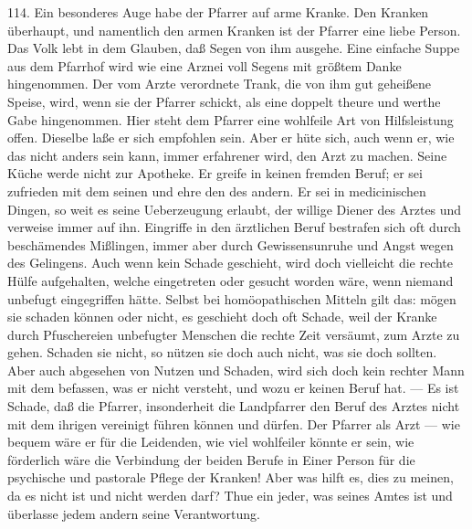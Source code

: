 114. Ein besonderes Auge habe der Pfarrer auf arme Kranke. Den Kranken überhaupt, und namentlich den armen Kranken ist der Pfarrer eine liebe Person. Das Volk lebt in dem Glauben, daß Segen von ihm ausgehe. Eine einfache Suppe aus dem Pfarrhof wird wie eine Arznei voll Segens mit größtem Danke hingenommen. Der vom Arzte verordnete Trank, die von ihm gut geheißene Speise, wird, wenn sie der Pfarrer schickt, als eine doppelt theure und werthe Gabe hingenommen. Hier steht dem Pfarrer eine wohlfeile Art von Hilfsleistung offen. Dieselbe laße er sich empfohlen sein. Aber er hüte sich, auch wenn er, wie das nicht anders sein kann, immer erfahrener wird, den Arzt zu machen. Seine Küche werde nicht zur Apotheke. Er greife in keinen fremden Beruf; er sei zufrieden mit dem seinen und ehre den des
andern. Er sei in medicinischen Dingen, so weit es seine Ueberzeugung erlaubt, der willige Diener des Arztes und verweise immer auf ihn. Eingriffe in den ärztlichen Beruf bestrafen sich oft durch beschämendes Mißlingen, immer aber durch Gewissensunruhe und Angst wegen des Gelingens. Auch wenn kein Schade geschieht, wird doch vielleicht die rechte Hülfe aufgehalten, welche eingetreten oder gesucht worden wäre, wenn niemand unbefugt eingegriffen hätte. Selbst bei homöopathischen Mitteln gilt das: mögen sie schaden können oder nicht, es geschieht doch oft Schade, weil der Kranke durch Pfuschereien unbefugter Menschen die rechte Zeit versäumt, zum Arzte zu gehen. Schaden sie nicht, so nützen sie doch auch nicht, was sie doch sollten. Aber auch abgesehen von Nutzen und Schaden, wird sich doch kein rechter Mann mit dem befassen, was er nicht versteht, und wozu er keinen Beruf hat. — Es ist Schade, daß die Pfarrer, insonderheit die Landpfarrer den Beruf des Arztes nicht mit dem ihrigen vereinigt führen können und dürfen. Der Pfarrer als Arzt — wie bequem wäre er für die Leidenden, wie viel wohlfeiler könnte er sein, wie förderlich wäre die Verbindung der beiden Berufe in Einer Person für die psychische und pastorale Pflege der Kranken! Aber was hilft es, dies zu meinen, da es nicht ist und nicht werden darf? Thue ein jeder, was seines Amtes ist und überlasse jedem andern seine Verantwortung.


